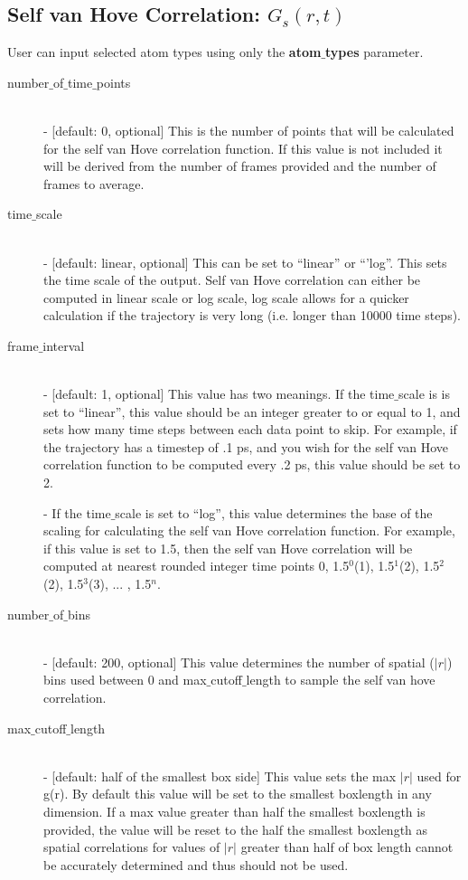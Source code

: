 \documentclass{article}
\begin{document}
\subsection{Self van Hove Correlation: $G_s(r,t)$} \label{sec::Gofrt_parm}
User can input selected atom types using only the \textbf{atom$\_$types} parameter.
\begin{description}	
	\item[number$\_$of$\_$time$\_$points]\hfill \\
	- [default: 0, optional] This is the number of points that will be calculated for the self van Hove correlation function.  If this value is not included it will be derived from the number of frames provided and the number of frames to average.
	
	\item[time$\_$scale] \hfill \\
	- [default: linear, optional] This can be set to ``linear'' or ``'log''.  This sets the time scale of the output. Self van Hove correlation can either be computed in linear scale or log scale, log scale allows for a quicker calculation if the trajectory is very long (i.e. longer than 10000 time steps).
	
	\item[frame$\_$interval] \hfill \\
	- [default: 1, optional] This value has two meanings.  If the time$\_$scale is is set to ``linear'', this value should be an integer greater to or equal to 1, and sets how many time steps between each data point to skip.  For example, if the trajectory has a timestep of .1 ps, and you wish for the self van Hove correlation function to be computed every .2 ps, this value should be set to 2. 
	
	- If the time$\_$scale is set to ``log'', this value determines the base of the scaling for calculating the self van Hove correlation function.   For example, if this value is set to 1.5, then the self van Hove correlation will be computed at nearest rounded integer time points 0, 1.5$^0$(1), 1.5$^1$(2), 1.5$^2$(2), 1.5$^3$(3), ... , 1.5$^{n}$.
	
	\item[number$\_$of$\_$bins] \hfill \\
	- [default: 200, optional] This value determines the number of spatial ($|r|$) bins used between 0 and max$\_$cutoff$\_$length to sample the self van hove correlation.
	
	\item[max$\_$cutoff$\_$length] \hfill \\
	- [default: half of the smallest box side] This value sets the max $|r|$ used for g(r).  By default this value will be set to the smallest boxlength in any dimension.  If a max value greater than half the smallest boxlength is provided, the value will be reset to the half the smallest boxlength as spatial correlations for values of $|r|$ greater than half of box length cannot be accurately determined and thus should not be used.
\end{description}
\end{document}
